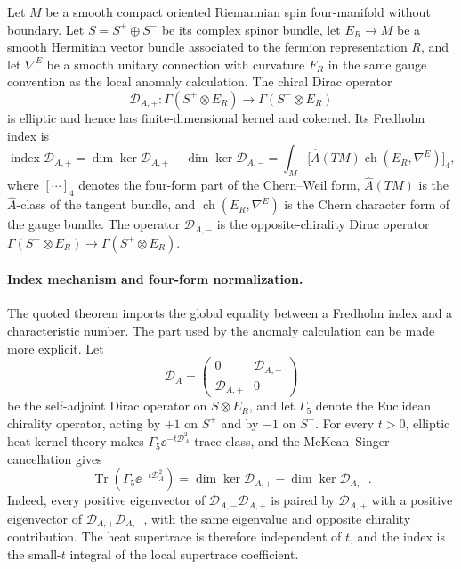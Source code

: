\begin{quotedtheorem}
\label{qthm:spin-dirac-index-four-dimensional}
Let \(M\) be a smooth compact oriented Riemannian spin four-manifold without
boundary.  Let \(S=S^+\oplus S^-\) be its complex spinor bundle, let
\(E_R\to M\) be a smooth Hermitian vector bundle associated to the fermion
representation \(R\), and let \(\nabla^E\) be a smooth unitary connection with
curvature \(F_R\) in the same gauge convention as the local anomaly
calculation.  The chiral Dirac operator
\[
  \mathcal D_{A,+}:
  \Gamma(S^+\otimes E_R)\longrightarrow
  \Gamma(S^-\otimes E_R)
\]
is elliptic and hence has finite-dimensional kernel and cokernel.  Its
Fredholm index is
\begin{equation}
  \operatorname{index}\mathcal D_{A,+}
  =
  \dim\ker\mathcal D_{A,+}
  -
  \dim\ker\mathcal D_{A,-}
  =
  \int_M
  \bigl[\widehat A(TM)\operatorname{ch}(E_R,\nabla^E)\bigr]_4 ,
  \label{eq:dirac-index-as-form}
\end{equation}
where \([\cdots]_4\) denotes the four-form part of the Chern--Weil form,
\(\widehat A(TM)\) is the \(\widehat A\)-class of the tangent bundle, and
\(\operatorname{ch}(E_R,\nabla^E)\) is the Chern character form of the gauge
bundle.  The operator \(\mathcal D_{A,-}\) is the opposite-chirality Dirac
operator
\(\Gamma(S^-\otimes E_R)\to\Gamma(S^+\otimes E_R)\).
\end{quotedtheorem}

\paragraph{Index mechanism and four-form normalization.}
The quoted theorem imports the global equality between a Fredholm index and a
characteristic number.  The part used by the anomaly calculation can be made
more explicit.  Let
\[
  \mathcal D_A
  =
  \begin{pmatrix}
    0&\mathcal D_{A,-}\\
    \mathcal D_{A,+}&0
  \end{pmatrix}
\]
be the self-adjoint Dirac operator on \(S\otimes E_R\), and let
\(\Gamma_5\) denote the Euclidean chirality operator, acting by \(+1\) on
\(S^+\) and by \(-1\) on \(S^-\).  For every \(t>0\), elliptic heat-kernel
theory makes \(\Gamma_5\ee^{-t\mathcal D_A^2}\) trace class, and the
McKean--Singer cancellation gives
\begin{equation}
  \operatorname{Tr}\!\left(\Gamma_5\ee^{-t\mathcal D_A^2}\right)
  =
  \dim\ker\mathcal D_{A,+}
  -
  \dim\ker\mathcal D_{A,-}.
  \label{eq:dirac-index-mckean-singer-anomaly}
\end{equation}
Indeed, every positive eigenvector of
\(\mathcal D_{A,-}\mathcal D_{A,+}\) is paired by \(\mathcal D_{A,+}\) with a
positive eigenvector of \(\mathcal D_{A,+}\mathcal D_{A,-}\), with the same
eigenvalue and opposite chirality contribution.  The heat supertrace is
therefore independent of \(t\), and the index is the small-\(t\) integral of
the local supertrace coefficient.

